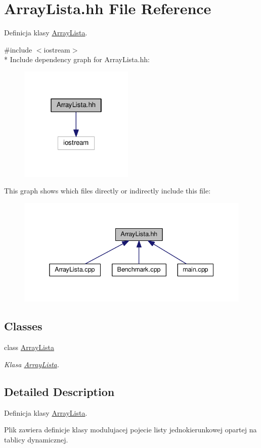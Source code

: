 \hypertarget{a00007}{}\section{Array\+Lista.\+hh File Reference}
\label{a00007}


Definicja klasy \hyperlink{a00001}{Array\+Lista}.  


{\ttfamily \#include $<$iostream$>$}\\*
Include dependency graph for Array\+Lista.\+hh\+:\nopagebreak
\begin{figure}[H]
\begin{center}
\leavevmode
\includegraphics[width=154pt]{a00020}
\end{center}
\end{figure}
This graph shows which files directly or indirectly include this file\+:\nopagebreak
\begin{figure}[H]
\begin{center}
\leavevmode
\includegraphics[width=338pt]{a00021}
\end{center}
\end{figure}
\subsection*{Classes}
\begin{DoxyCompactItemize}
\item 
class \hyperlink{a00001}{Array\+Lista}
\begin{DoxyCompactList}\small\item\em Klasa \hyperlink{a00001}{Array\+Lista}. \end{DoxyCompactList}\end{DoxyCompactItemize}


\subsection{Detailed Description}
Definicja klasy \hyperlink{a00001}{Array\+Lista}. 

Plik zawiera definicje klasy modulujacej pojecie listy jednokierunkowej opartej na tablicy dynamicznej. 